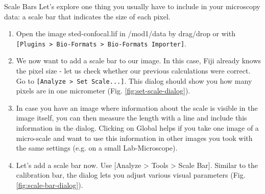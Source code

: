 \begin{taskbox}{Scale Bars}
Let's explore one thing you usually have to include in your microscopy data: a scale bar that indicates the size of each pixel.

\begin{enumerate}
	\item Open the image sted-confocal.lif in /mod1/data by drag/drop or with \texttt{[Plugins > Bio-Formats > Bio-Formats Importer]}.  
	\item We now want to add a scale bar to our image. In this case, Fiji already knows the pixel size - let us check whether our previous calculations were correct. Go to \texttt{[Analyze > Set Scale...]}. This dialog should show you how many pixels are in one micrometer (Fig. \ref{fig:set-scale-dialog}).
	
	\begin{minipage}[t]{\linewidth}
		\begin{center}
		\medskip
		\label{fig:set-scale-dialog}
		\end{center}
	\end{minipage}
	
	\item In case you have an image where information about the scale is visible in the image itself, you can then measure the length with a line and include this information in the dialog. Clicking on Global helps if you take one image of a micro-scale and want to use this information in other images you took with the same settings (e.g. on a small Lab-Microscope).
	\item Let's add a scale bar now. Use [Analyze > Tools > Scale Bar]. Similar to the calibration bar, the dialog lets you adjust various visual parameters (Fig. \ref{fig:scale-bar-dialog}).



\end{enumerate}
\end{taskbox}
